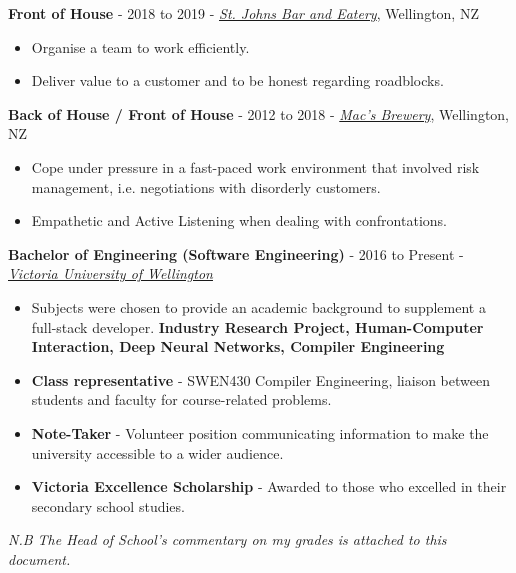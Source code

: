 \documentclass[9pt]{developercv}
\begin{document}
\textbf{Front of House} - 2018 to 2019 - \emph{\href{https://stjohnsbar.co.nz/}{St. Johns Bar and Eatery}}, Wellington, NZ
\begin{itemize}
    \item Organise a team to work efficiently.
    \item Deliver value to a customer and to be honest regarding roadblocks.
\end{itemize}

\textbf{Back of House / Front of House} - 2012 to 2018 - \emph{\href{https://macsbrewbar.co.nz/}{Mac's Brewery}}, Wellington, NZ
\begin{itemize}
    \item Cope under pressure in a fast-paced work environment that involved risk management, i.e. negotiations with disorderly customers.
    \item Empathetic and Active Listening when dealing with confrontations.
\end{itemize}



\textbf{Bachelor of Engineering (Software Engineering)} - 2016 to Present - \emph{\href{https://www.wgtn.ac.nz/}{Victoria University of Wellington}}
\begin{itemize}
    \item Subjects were chosen to provide an academic background to supplement a full-stack developer. \textbf{Industry Research Project, Human-Computer Interaction, Deep Neural Networks, Compiler Engineering}
    \item \textbf{Class representative} - SWEN430 Compiler Engineering, liaison between students and faculty for course-related problems. 
    \item \textbf{Note-Taker} - Volunteer position communicating information to make the university accessible to a wider audience. 
    \item \textbf{Victoria Excellence Scholarship} - Awarded to those who excelled in their secondary school studies. 
\end{itemize}
\emph{N.B The Head of School's commentary on my grades is attached to this document.} \\
\end{document}
